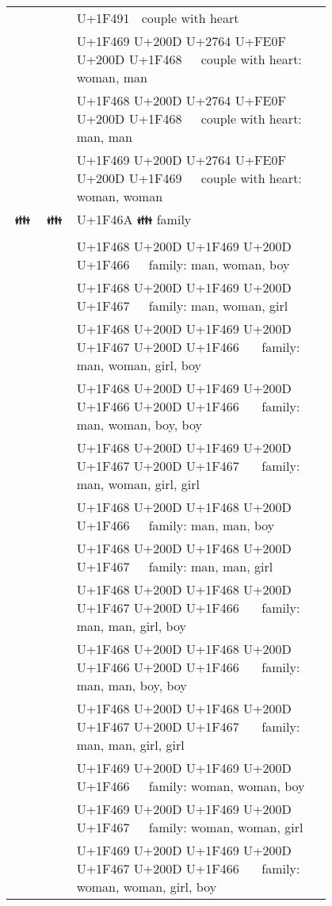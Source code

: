\documentclass[a4paper,12pt]{article}
\newcommand{\fontA}[1]{{\fontspec[RawFeature={mode=harf,+dist,+ccmp}]{Segoe UI Emoji} #1}}
\newcommand{\fontB}[1]{{\fontspec[RawFeature={mode=harf,+dist,+ccmp}]{Noto Color Emoji} #1}}
\begin{document}
\begin{longtable}[c]{ccp{0.8\linewidth}}
\fontA{💑}&\fontB{💑}&U+1F491 💑 couple with heart\\
\fontA{👩‍❤️‍👨}&\fontB{👩‍❤️‍👨}&U+1F469 U+200D U+2764 U+FE0F U+200D U+1F468 👩‍❤️‍👨 couple with heart: woman, man\\
\fontA{👨‍❤️‍👨}&\fontB{👨‍❤️‍👨}&U+1F468 U+200D U+2764 U+FE0F U+200D U+1F468 👨‍❤️‍👨 couple with heart: man, man\\
\fontA{👩‍❤️‍👩}&\fontB{👩‍❤️‍👩}&U+1F469 U+200D U+2764 U+FE0F U+200D U+1F469 👩‍❤️‍👩 couple with heart: woman, woman\\
\fontA{👪}&\fontB{👪}&U+1F46A 👪 family\\
\fontA{👨‍👩‍👦}&\fontB{👨‍👩‍👦}&U+1F468 U+200D U+1F469 U+200D U+1F466 👨‍👩‍👦 family: man, woman, boy\\
\fontA{👨‍👩‍👧}&\fontB{👨‍👩‍👧}&U+1F468 U+200D U+1F469 U+200D U+1F467 👨‍👩‍👧 family: man, woman, girl\\
\fontA{👨‍👩‍👧‍👦}&\fontB{👨‍👩‍👧‍👦}&U+1F468 U+200D U+1F469 U+200D U+1F467 U+200D U+1F466 👨‍👩‍👧‍👦 family: man, woman, girl, boy\\
\fontA{👨‍👩‍👦‍👦}&\fontB{👨‍👩‍👦‍👦}&U+1F468 U+200D U+1F469 U+200D U+1F466 U+200D U+1F466 👨‍👩‍👦‍👦 family: man, woman, boy, boy\\
\fontA{👨‍👩‍👧‍👧}&\fontB{👨‍👩‍👧‍👧}&U+1F468 U+200D U+1F469 U+200D U+1F467 U+200D U+1F467 👨‍👩‍👧‍👧 family: man, woman, girl, girl\\
\fontA{👨‍👨‍👦}&\fontB{👨‍👨‍👦}&U+1F468 U+200D U+1F468 U+200D U+1F466 👨‍👨‍👦 family: man, man, boy\\
\fontA{👨‍👨‍👧}&\fontB{👨‍👨‍👧}&U+1F468 U+200D U+1F468 U+200D U+1F467 👨‍👨‍👧 family: man, man, girl\\
\fontA{👨‍👨‍👧‍👦}&\fontB{👨‍👨‍👧‍👦}&U+1F468 U+200D U+1F468 U+200D U+1F467 U+200D U+1F466 👨‍👨‍👧‍👦 family: man, man, girl, boy\\
\fontA{👨‍👨‍👦‍👦}&\fontB{👨‍👨‍👦‍👦}&U+1F468 U+200D U+1F468 U+200D U+1F466 U+200D U+1F466 👨‍👨‍👦‍👦 family: man, man, boy, boy\\
\fontA{👨‍👨‍👧‍👧}&\fontB{👨‍👨‍👧‍👧}&U+1F468 U+200D U+1F468 U+200D U+1F467 U+200D U+1F467 👨‍👨‍👧‍👧 family: man, man, girl, girl\\
\fontA{👩‍👩‍👦}&\fontB{👩‍👩‍👦}&U+1F469 U+200D U+1F469 U+200D U+1F466 👩‍👩‍👦 family: woman, woman, boy\\
\fontA{👩‍👩‍👧}&\fontB{👩‍👩‍👧}&U+1F469 U+200D U+1F469 U+200D U+1F467 👩‍👩‍👧 family: woman, woman, girl\\
\fontA{👩‍👩‍👧‍👦}&\fontB{👩‍👩‍👧‍👦}&U+1F469 U+200D U+1F469 U+200D U+1F467 U+200D U+1F466 👩‍👩‍👧‍👦 family: woman, woman, girl, boy\\

\end{longtable}
\end{document}
